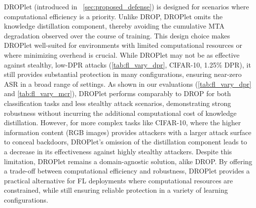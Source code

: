  DROPlet (introduced in ~\cref{sec:proposed_defense}) is designed for scenarios where computational efficiency is a priority. Unlike DROP, DROPlet omits the knowledge distillation component, thereby avoiding the cumulative MTA degradation observed over the course of training. This design choice makes DROPlet well-suited for environments with limited computational resources or where minimizing overhead is crucial. While DROPlet may not be as effective against stealthy, low-DPR attacks (\cref{tab:fl_vary_dpr}, CIFAR-10, 1.25\% DPR), it still provides substantial protection in many configurations, ensuring near-zero ASR in a broad range of settings. As shown in our evaluations (\cref{tab:fl_vary_dpr} and \cref{tab:fl_vary_mcr}), DROPlet performs comparably to DROP for both classification tasks and less stealthy attack scenarios, demonstrating strong robustness without incurring the additional computational cost of knowledge distillation. However, for more complex tasks like CIFAR-10, where the higher information content (RGB images) provides attackers with a larger attack surface to conceal backdoors, DROPlet’s omission of the distillation component leads to a decrease in its effectiveness against highly stealthy attackers. Despite this limitation, DROPlet remains a domain-agnostic solution, alike DROP. By offering a trade-off between computational efficiency and robustness, DROPlet provides a practical alternative for FL deployments where computational resources are constrained, while still ensuring reliable protection in a variety of learning configurations.

